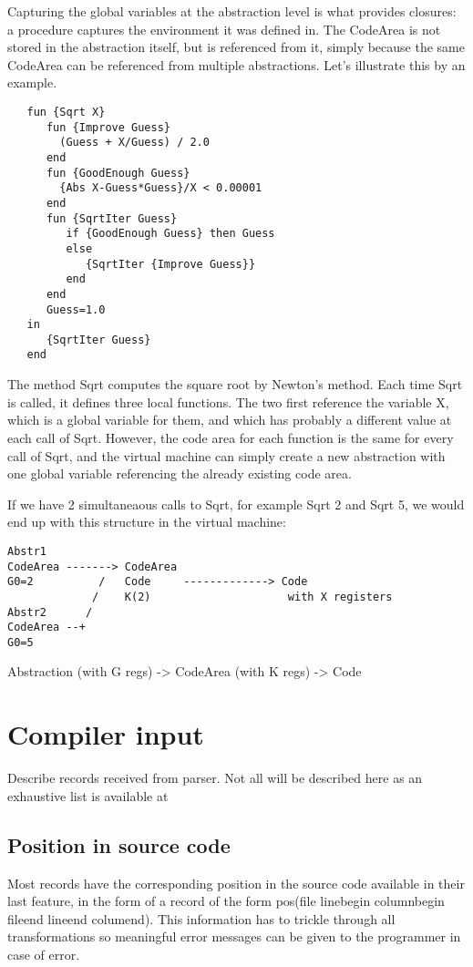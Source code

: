 \documentclass[a4paper]{memoir}
\begin{document}
Capturing the global variables at the abstraction level is what provides
closures: a procedure captures the environment it was defined in.
The CodeArea is not stored in the abstraction itself, but is referenced from
it, simply because the same CodeArea can be referenced from multiple
abstractions. Let's illustrate this by an example. 


\begin{lstlisting}
   fun {Sqrt X}
      fun {Improve Guess}
        (Guess + X/Guess) / 2.0
      end
      fun {GoodEnough Guess}
        {Abs X-Guess*Guess}/X < 0.00001
      end
      fun {SqrtIter Guess}
         if {GoodEnough Guess} then Guess
         else
            {SqrtIter {Improve Guess}}
         end
      end
      Guess=1.0
   in
      {SqrtIter Guess}
   end
\end{lstlisting}
The method Sqrt computes the square root by Newton's method. Each time Sqrt is
called, it defines three local functions. The two first reference the variable
X, which is a global variable for them, and which has probably a different
value at each call of Sqrt. However, the code area for each function is the
same for every call of Sqrt, and the virtual machine can simply create a new
abstraction with one global variable referencing the already existing code
area. 

If we have 2 simultaneaous calls to Sqrt, for example {Sqrt 2} and {Sqrt 5}, we
would end up with this structure in the virtual machine:

\begin{verbatim}
Abstr1
CodeArea -------> CodeArea
G0=2          /   Code     -------------> Code
             /    K(2)                     with X registers
Abstr2      /
CodeArea --+
G0=5
\end{verbatim}



Abstraction (with G regs)  -> CodeArea (with K regs) -> Code
\section{Compiler input}\label{section:compilerinput}
Describe records received from parser.
Not all will be described here as an exhaustive list is available at %
\subsection{Position in source code}
Most records have the corresponding position in the source code available in their last feature, in the form of a record of the form pos(file linebegin columnbegin fileend lineend columend). This information has to trickle through all transformations so meaningful error messages can be given to the programmer in case of error.
\end{document}
